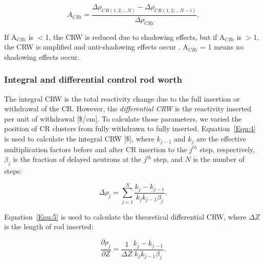 \begin{equation}
\label{Equ:3}
{{A}_{CRi}}=\dfrac{{{\Delta}{\rho}_{CR(1,2,\ldots N)}}-{{\Delta}{\rho}_{CR(1,2,\ldots N-i)}}}{{\Delta}{\rho}_{CRi}}.
\end{equation}

If A$_{CRi}$ is $<$1, the CRW is reduced due to shadowing effects, but if A$_{CRi}$ is $>$1, the CRW is amplified and anti-shadowing effects occur \cite{girardin2007control}. A$_{CRi}$ = 1 means no shadowing effects occur.

\subsubsection{Integral and differential control rod worth}

The integral CRW is the total reactivity change due to the full 
insertion or withdrawal of the CR. However, the \textit{differential CRW} is the
reactivity inserted per unit of withdrawal [\$/cm]. To calculate those 
parameters, we varied the position of CR clusters from fully withdrawn to 
fully inserted. Equation~\ref{Equ:4} is used to calculate the integral CRW 
[\$], where $k_{j-1}$ and $k_{j}$ are the effective multiplication factors 
before and after CR insertion to the $j$$^{th}$ step, respectively, $\beta_{j}$ is the
fraction of delayed neutrons at the $j$$^{th}$ step, and $N$ is the number of steps:

\begin{equation}
\label{Equ:4}
{{\Delta}{\rho}_{j}}=\sum_{j=1}^{N}\dfrac{{k_{j}}-{k_{j-1}}}{{{k_{j}}{k_{j-1}}}{{\beta}_{j}}}.
\end{equation}

Equation~\ref{Equ:5} is used to calculate the theoretical differential CRW, where 
$\Delta Z$ is the length of rod inserted:

\begin{equation}
\label{Equ:5}
\dfrac{{\partial}{\rho}_{j}}{{\partial{Z}}}=\dfrac{1}{{\Delta}{Z}}\dfrac{{k_{j}}-{k_{j-1}}}{{{k_{j}}{k_{j-1}}}{{\beta}_{j}}}.
\end{equation}



